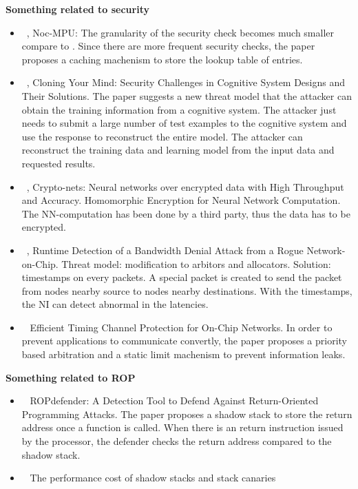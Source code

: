 \documentclass[]{article}
\begin{document}
\textbf{Something related to security}
\begin{itemize}
	\item ~\cite{porquet2011noc}, Noc-MPU: The granularity of the security check
	becomes much smaller compare to \cite{fiorin2008secure}. Since there are
	more frequent security checks, the paper proposes a caching machenism to
	store the lookup table of entries.
	\item ~\cite{liu2015cloning}, Cloning Your Mind: Security Challenges in
	Cognitive System Designs and Their Solutions. The paper suggests a new
	threat model that the attacker can obtain the training information from a
	cognitive system. The attacker just needs to submit a large number of test
	examples to the cognitive system and use the response to reconstruct the
	entire model. The attacker can reconstruct the training data and learning
	model from the input data and requested results.
	\item ~\cite{xie2014crypto}, Crypto-nets: Neural networks over encrypted
	data with High Throughput and Accuracy. Homomorphic Encryption for Neural
	Network Computation. The NN-computation has been done by a third party,
	thus the data has to be encrypted.
	\item ~\cite{js2015runtime}, Runtime Detection of a Bandwidth Denial Attack
	from a Rogue Network-on-Chip. Threat model: modification to arbitors and
	allocators.  Solution: timestamps on every packets. A special packet is created
	to send the packet from nodes nearby source to nodes nearby destinations. With
	the timestamps, the NI can detect abnormal in the latencies.
	\item ~\cite{wang2012efficient} Efficient Timing Channel Protection for
	On-Chip Networks. In order to prevent applications to communicate convertly,
	the paper proposes a priority based arbitration and a static limit machenism to
	prevent information leaks.
\end{itemize}

\textbf{Something related to ROP}
\begin{itemize}
	\item ~\cite{davi2011ropdefender} ROPdefender: A Detection Tool to Defend
Against Return-Oriented Programming Attacks. The paper proposes a shadow stack
to store the return address once a function is called. When there is an return
instruction issued by the processor, the defender checks the return address
compared to the shadow stack.
	\item ~\cite{dang2015performance} The performance cost of shadow stacks and
stack canaries	
\end{itemize}

{}

\end{document}
